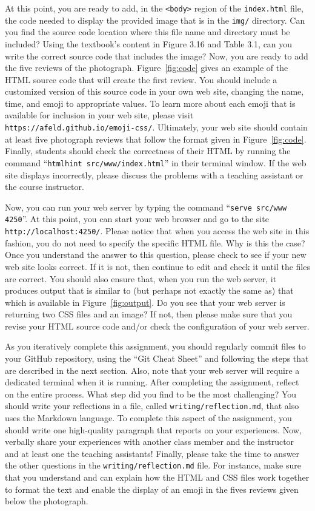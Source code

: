 \documentclass[11pt]{article}
\newcommand{\mainprogram}{\lstinline{index.html}}
\newcommand{\reflection}{\lstinline{writing/reflection.md}}
\newcommand{\command}[1]{``\lstinline{#1}''}
\newcommand{\program}[1]{\lstinline{#1}}
\newcommand{\url}[1]{\lstinline{#1}}
\begin{document}
At this point, you are ready to add, in the \program{<body>} region of the
\mainprogram{} file, the code needed to display the provided image that is in
the \program{img/} directory. Can you find the source code location where this
file name and directory must be included? Using the textbook's content in Figure
3.16 and Table 3.1, can you write the correct source code that includes the
image? Now, you are ready to add the five reviews of the photograph.
Figure~\ref{fig:code} gives an example of the HTML source code that will create
the first review. You should include a customized version of this source code in
your own web site, changing the name, time, and emoji to appropriate values. To
learn more about each emoji that is available for inclusion in your web site,
please visit \url{https://afeld.github.io/emoji-css/}. Ultimately, your web site
should contain at least five photograph reviews that follow the format given in
Figure~\ref{fig:code}. Finally, students should check the correctness of their
HTML by running the command \command{htmlhint src/www/index.html} in their
terminal window. If the web site displays incorrectly, please discuss the
problems with a teaching assistant or the course instructor.



Now, you can run your web server by typing the command \command{serve src/www
4250}. At this point, you can start your web browser and go to the site
\url{http://localhost:4250/}. Please notice that when you access the web site in
this fashion, you do not need to specify the specific HTML file. Why is this the
case? Once you understand the answer to this question, please check to see if
your new web site looks correct. If it is not, then continue to edit and check
it until the files are correct. You should also ensure that, when you run the
web server, it produces output that is similar to (but perhaps not exactly the
same as) that which is available in Figure~\ref{fig:output}. Do you see that
your web server is returning two CSS files and an image? If not, then please
make sure that you revise your HTML source code and/or check the configuration
of your web server.

As you iteratively complete this assignment, you should regularly commit files
to your GitHub repository, using the ``Git Cheat Sheet'' and following the steps
that are described in the next section. Also, note that your web server will
require a dedicated terminal when it is running. After completing the
assignment, reflect on the entire process. What step did you find to be the most
challenging? You should write your reflections in a file, called \reflection{},
that also uses the Markdown language. To complete this aspect of the assignment,
you should write one high-quality paragraph that reports on your experiences.
Now, verbally share your experiences with another class member and the
instructor and at least one the teaching assistants! Finally, please take the
time to answer the other questions in the \reflection{} file. For instance, make
sure that you understand and can explain how the HTML and CSS files work
together to format the text and enable the display of an emoji in the fives
reviews given below the photograph.
\end{document}
